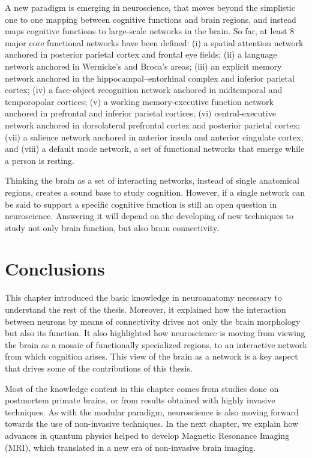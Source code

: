 A new paradigm is emerging in neuroscience, that moves beyond the simplistic
one to one mapping between cognitive functions and brain regions, and instead
maps cognitive functions to large-scale networks in the brain. So far, at least
8 major core functional networks have been defined\cite{Bressler2010}:
(i) a spatial attention network anchored in posterior parietal cortex and frontal eye fields;
(ii) a language network anchored in Wernicke’s and Broca’s areas;
(iii) an explicit memory network anchored in the hippocampal–entorhinal 
complex and inferior parietal cortex; (iv) a face-object recognition
network anchored in midtemporal and temporopolar cortices; (v) a
working memory-executive function network anchored in prefrontal and
inferior parietal cortices; (vi) central-executive network anchored in
dorsolateral prefrontal cortex and posterior parietal cortex; (vii) a salience
network anchored in anterior insula and anterior cingulate cortex; and (viii)
a default mode network, a set of functional networks that emerge while a person
is resting.

Thinking the brain as a set of interacting networks, instead of single anatomical
regions, creates a sound base to study cognition\cite{Bressler2010}. However,
if a single network can be said to support a specific cognitive function is 
still an open question in neuroscience. Answering it will depend on the 
developing of new techniques to study not only brain function, but also brain
connectivity.

\section{Conclusions}
This chapter introduced the basic knowledge in neuroanatomy necessary to
understand the rest of the thesis. Moreover, it explained how the interaction
between neurons by means of connectivity drives not only the brain morphology
but also its function. It also highlighted how neuroscience is moving from
viewing the brain as a mosaic of functionally specialized regions, to an
interactive network from which cognition arises. This view of the brain as 
a network is a key aspect that drives some of the contributions of this thesis.

Most of the knowledge content in this chapter comes from studies done on 
postmortem primate brains, or from results obtained with highly invasive
techniques. As with the modular paradigm, neuroscience is also moving forward
towards the use of non-invasive techniques. In the next chapter, we explain how 
advances in quantum physics helped to develop Magnetic Resonance Imaging (MRI),
which translated in a new era of non-invasive brain imaging.

\chapterbib
